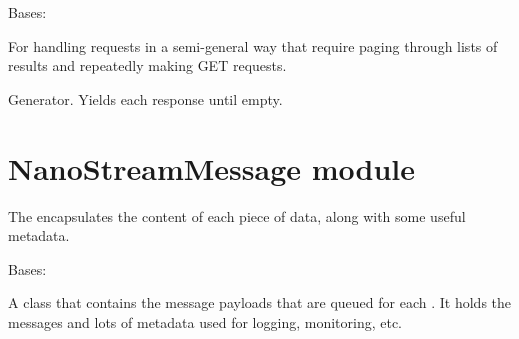 \documentclass[letterpaper,10pt,english]{sphinxmanual}
\begin{document}

\begin{fulllineitems}
\label{\detokenize{api:nanostream.node_classes.network_nodes.PaginatedHttpGetRequest}}
Bases: 

For handling requests in a semi-general way that require paging through
lists of results and repeatedly making GET requests.

\begin{fulllineitems}
\label{\detokenize{api:nanostream.node_classes.network_nodes.PaginatedHttpGetRequest.responses}}
Generator. Yields each response until empty.

\end{fulllineitems}


\end{fulllineitems}

\label{\detokenize{api:module-nanostream.message.message}}

\section{NanoStreamMessage module}
\label{\detokenize{api:nanostreammessage-module}}
The  encapsulates the content of each piece of data,
along with some useful metadata.

\begin{fulllineitems}
\label{\detokenize{api:nanostream.message.message.NanoStreamMessage}}
Bases: 

A class that contains the message payloads that are queued for
each . It holds the messages and lots
of metadata used for logging, monitoring, etc.

\end{fulllineitems}
\end{document}
